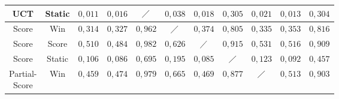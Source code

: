 \begin{table}[H]
{\begin{tabular}{|c|c|c|c|c|c|c|c|c|c|c|}
            \ac{UCT}                          & Static        & \cellcolor[HTML]{f86b6b}$0{,}011$ & \cellcolor[HTML]{f86d6b}$0{,}016$ & $\diagup$                         & \cellcolor[HTML]{f8726c}$0{,}038$ & \cellcolor[HTML]{f86d6b}$0{,}018$ & \cellcolor[HTML]{fcb87a}$0{,}305$ & \cellcolor[HTML]{f86e6c}$0{,}021$ & \cellcolor[HTML]{f86c6b}$0{,}013$ & \cellcolor[HTML]{fcb87a}$0{,}304$ \\ \hline
            Score                             & Win           & \cellcolor[HTML]{fcba7a}$0{,}314$ & \cellcolor[HTML]{fcbe7b}$0{,}327$ & \cellcolor[HTML]{6fc27c}$0{,}962$ & $\diagup$                         & \cellcolor[HTML]{fdca7d}$0{,}374$ & \cellcolor[HTML]{a0d07f}$0{,}805$ & \cellcolor[HTML]{fcc07b}$0{,}335$ & \cellcolor[HTML]{fcc47c}$0{,}353$ & \cellcolor[HTML]{9dcf7f}$0{,}816$ \\ \hline
            Score                             & Score         & \cellcolor[HTML]{fceb84}$0{,}510$ & \cellcolor[HTML]{fee683}$0{,}484$ & \cellcolor[HTML]{69c07c}$0{,}982$ & \cellcolor[HTML]{d8e082}$0{,}626$ & $\diagup$                         & \cellcolor[HTML]{7ec67d}$0{,}915$ & \cellcolor[HTML]{f6e984}$0{,}531$ & \cellcolor[HTML]{fbea84}$0{,}516$ & \cellcolor[HTML]{80c77d}$0{,}909$ \\ \hline
            Score                             & Static        & \cellcolor[HTML]{f98470}$0{,}106$ & \cellcolor[HTML]{f97f6f}$0{,}086$ & \cellcolor[HTML]{c3da81}$0{,}695$ & \cellcolor[HTML]{fa9b74}$0{,}195$ & \cellcolor[HTML]{f97f6f}$0{,}085$ & $\diagup$                         & \cellcolor[HTML]{f98871}$0{,}123$ & \cellcolor[HTML]{f9806f}$0{,}092$ & \cellcolor[HTML]{fedf81}$0{,}457$ \\ \hline
            \tiny \makecell{Partial-                                                                                                                                                                                                                                                                                                                                                              \\Score} &           Win & \cellcolor[HTML]{fee081}$0{,}459$ & \cellcolor[HTML]{fee482}$0{,}474$ & \cellcolor[HTML]{6ac07c}$0{,}979$ & \cellcolor[HTML]{ccdd82}$0{,}665$ & \cellcolor[HTML]{fee282}$0{,}469$ & \cellcolor[HTML]{8aca7e}$0{,}877$ & $\diagup$                         & \cellcolor[HTML]{fbea84}$0{,}513$ & \cellcolor[HTML]{82c77d}$0{,}903$ \\ \hline

\end{tabular}}
\end{table}
